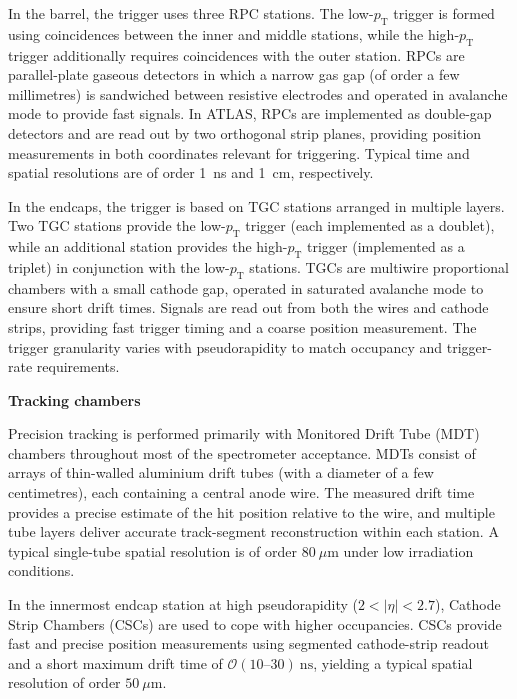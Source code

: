 In the barrel, the trigger uses three RPC stations.
The low-$p_\mathrm{T}$ trigger is formed using coincidences between the inner and middle stations, while the high-$p_\mathrm{T}$ trigger additionally requires coincidences with the outer station.
RPCs are parallel-plate gaseous detectors in which a narrow gas gap (of order a few millimetres) is sandwiched between resistive electrodes and operated in avalanche mode to provide fast signals.
In ATLAS, RPCs are implemented as double-gap detectors and are read out by two orthogonal strip planes, providing position measurements in both coordinates relevant for triggering.
Typical time and spatial resolutions are of order 1~ns and 1~cm, respectively.

In the endcaps, the trigger is based on TGC stations arranged in multiple layers.
Two TGC stations provide the low-$p_\mathrm{T}$ trigger (each implemented as a doublet), while an additional station provides the high-$p_\mathrm{T}$ trigger (implemented as a triplet) in conjunction with the low-$p_\mathrm{T}$ stations.
TGCs are multiwire proportional chambers with a small cathode gap, operated in saturated avalanche mode to ensure short drift times.
Signals are read out from both the wires and cathode strips, providing fast trigger timing and a coarse position measurement.
The trigger granularity varies with pseudorapidity to match occupancy and trigger-rate requirements.

\vspace{0.5em}

\textbf{Tracking chambers}

Precision tracking is performed primarily with Monitored Drift Tube (MDT) chambers throughout most of the spectrometer acceptance.
MDTs consist of arrays of thin-walled aluminium drift tubes (with a diameter of a few centimetres), each containing a central anode wire.
The measured drift time provides a precise estimate of the hit position relative to the wire, and multiple tube layers deliver accurate track-segment reconstruction within each station.
A typical single-tube spatial resolution is of order $80~\mu$m under low irradiation conditions.

In the innermost endcap station at high pseudorapidity ($2 < |\eta| < 2.7$), Cathode Strip Chambers (CSCs) are used to cope with higher occupancies.
CSCs provide fast and precise position measurements using segmented cathode-strip readout and a short maximum drift time of $\mathcal{O}(10\text{--}30)~\mathrm{ns}$, yielding a typical spatial resolution of order $50~\mu$m.

